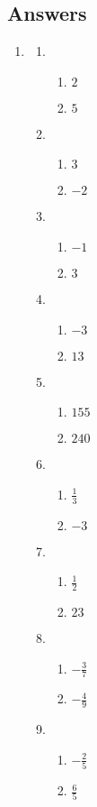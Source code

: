 \documentclass[a4paper,12pt]{article}
\begin{document}
\newpage
\subsection*{Answers}

\begin{enumerate}
\item
    \begin{multicols}{2}
    \begin{enumerate}
    \item
        \begin{enumerate}
        \item $2$
        \item $5$
        \end{enumerate}
    \item
        \begin{enumerate}
        \item $3$
        \item $-2$
        \end{enumerate}
    \item
        \begin{enumerate}
        \item $-1$
        \item $3$
        \end{enumerate}
    \item
        \begin{enumerate}
        \item $-3$
        \item $13$
        \end{enumerate}
    \item
        \begin{enumerate}
        \item $155$
        \item $240$
        \end{enumerate}
    \item
        \begin{enumerate}
        \item $\frac{1}{3}$
        \item $-3$
        \end{enumerate}
    \item
        \begin{enumerate}
        \item $\frac{1}{2}$
        \item $23$
        \end{enumerate}
    \item
        \begin{enumerate}
        \item $-\frac{3}{7}$
        \item $-\frac{4}{9}$
        \end{enumerate}
    \item
        \begin{enumerate}
        \item $-\frac{2}{5}$
        \item $\frac{6}{5}$
        \end{enumerate}
    \end{enumerate}
    \end{multicols}
\end{enumerate}
\end{document}
